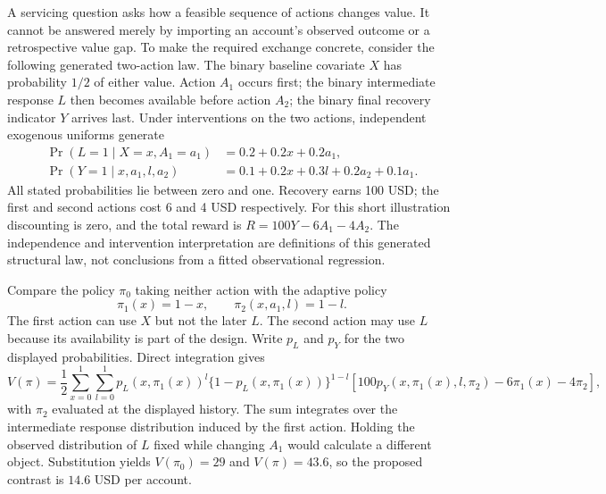 A servicing question asks how a feasible sequence of actions changes value.
It cannot be answered merely by importing an account's observed outcome or
a retrospective value gap. To make the required exchange concrete, consider
the following generated two-action law. The binary baseline covariate $X$
has probability $1/2$ of either value. Action $A_1$ occurs first; the binary
intermediate response $L$ then becomes available before action $A_2$; the
binary final recovery indicator $Y$ arrives last. Under interventions on
the two actions, independent exogenous uniforms generate
\begin{align}
 \Pr(L=1\mid X=x,A_1=a_1)&=0.2+0.2x+0.2a_1,\\
 \Pr(Y=1\mid x,a_1,l,a_2)&=0.1+0.2x+0.3l+0.2a_2+0.1a_1.
 \label{exec13:i3-servicing-law}
\end{align}
All stated probabilities lie between zero and one. Recovery earns 100 USD;
the first and second actions cost 6 and 4 USD respectively. For this short
illustration discounting is zero, and the total reward is
$R=100Y-6A_1-4A_2$. The independence and intervention interpretation are
definitions of this generated structural law, not conclusions from a fitted
observational regression.

Compare the policy $\pi_0$ taking neither action with the adaptive policy
\[
 \pi_1(x)=1-x,\qquad \pi_2(x,a_1,l)=1-l.
\]
The first action can use $X$ but not the later $L$. The second action may
use $L$ because its availability is part of the design. Write $p_L$ and
$p_Y$ for the two displayed probabilities. Direct integration gives
\begin{equation}
 V(\pi)=\frac12\sum_{x=0}^{1}\sum_{l=0}^{1}
   p_L(x,\pi_1(x))^l\{1-p_L(x,\pi_1(x))\}^{1-l}
   \left[100p_Y(x,\pi_1(x),l,\pi_2)-6\pi_1(x)-4\pi_2\right],
 \label{exec13:i3-policy-value}
\end{equation}
with $\pi_2$ evaluated at the displayed history. The sum integrates over
the intermediate response distribution induced by the first action. Holding
the observed distribution of $L$ fixed while changing $A_1$ would calculate
a different object. Substitution yields $V(\pi_0)=29$ and
$V(\pi)=43.6$, so the proposed contrast is $14.6$ USD per account.

